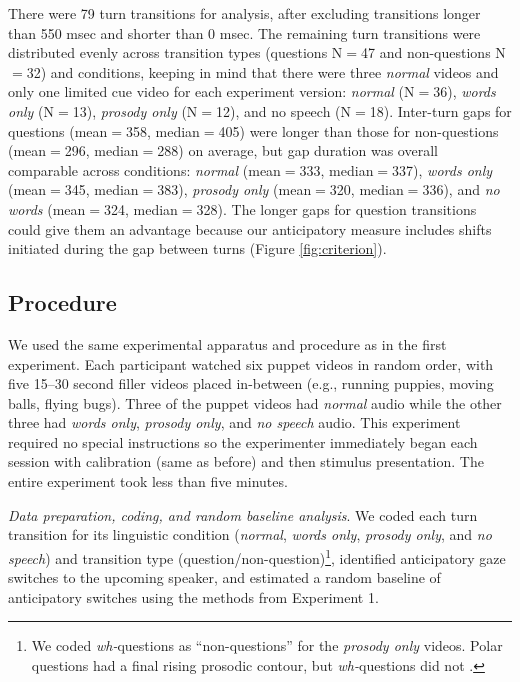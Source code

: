 \documentclass[authoryear, 12pt]{elsarticle}
\begin{document}
There were 79 turn transitions for analysis, after excluding transitions longer than 550 msec and shorter than 0 msec. The remaining turn transitions were distributed evenly across transition types (questions N$=$47 and non-questions N$=$32) and conditions, keeping in mind that there were three \textit{normal} videos and only one limited cue video for each experiment version: \textit{normal} (N$=$36), \textit{words only} (N$=$13), \textit{prosody only} (N$=$12), and {no speech} (N$=$18). Inter-turn gaps for questions (mean$=$358, median$=$405) were longer than those for non-questions (mean$=$296, median$=$288) on average, but gap duration was overall comparable across conditions: \textit{normal} (mean$=$333, median$=$337), \textit{words only} (mean$=$345, median$=$383), \textit{prosody only} (mean$=$320, median$=$336), and \textit{no words} (mean$=$324, median$=$328). The longer gaps for question transitions could give them an advantage because our anticipatory measure includes shifts initiated during the gap between turns (Figure \ref{fig:criterion}).

\subsection{Procedure}
We used the same experimental apparatus and procedure as in the first experiment. Each participant watched six puppet videos in random order, with five 15--30 second filler videos placed in-between (e.g., running puppies, moving balls, flying bugs). Three of the puppet videos had \textit{normal} audio while the other three had \textit{words only}, \textit{prosody only}, and \textit{no speech} audio. This experiment required no special instructions so the experimenter immediately began each session with calibration (same as before) and then stimulus presentation. The entire experiment took less than five minutes.

\textit{Data preparation, coding, and random baseline analysis}. We coded each turn transition for its linguistic condition (\textit{normal}, \textit{words only}, \textit{prosody only}, and \textit{no speech}) and transition type (question/non-question)\footnote{We coded \textit{wh-}questions as ``non-questions'' for the \textit{prosody only} videos. Polar questions had a final rising prosodic contour, but \textit{wh-}questions did not  \citep{hedberg2010}.}, identified anticipatory gaze switches to the upcoming speaker, and estimated a random baseline of anticipatory switches using the methods from Experiment 1.
\end{document}
